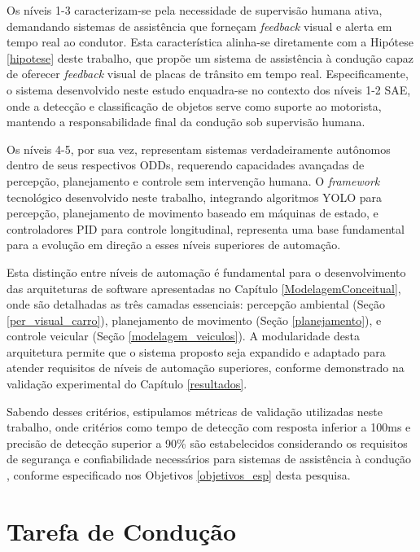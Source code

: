 Os níveis 1-3 caracterizam-se pela necessidade de supervisão humana ativa, demandando sistemas de assistência que forneçam \textit{feedback} visual e alerta em tempo real ao condutor. Esta característica alinha-se diretamente com a Hipótese \ref{hipotese} deste trabalho, que propõe um sistema de assistência à condução capaz de oferecer \textit{feedback} visual de placas de trânsito em tempo real. Especificamente, o sistema desenvolvido neste estudo enquadra-se no contexto dos níveis 1-2 SAE, onde a detecção e classificação de objetos serve como suporte ao motorista, mantendo a responsabilidade final da condução sob supervisão humana.

Os níveis 4-5, por sua vez, representam sistemas verdadeiramente autônomos dentro de seus respectivos ODDs, requerendo capacidades avançadas de percepção, planejamento e controle sem intervenção humana. O \textit{framework} tecnológico desenvolvido neste trabalho, integrando algoritmos YOLO para percepção, planejamento de movimento baseado em máquinas de estado, e controladores PID para controle longitudinal, representa uma base fundamental para a evolução em direção a esses níveis superiores de automação.

Esta distinção entre níveis de automação é fundamental para o desenvolvimento das arquiteturas de software apresentadas no Capítulo \ref{ModelagemConceitual}, onde são detalhadas as três camadas essenciais: percepção ambiental (Seção \ref{per_visual_carro}), planejamento de movimento (Seção \ref{planejamento}), e controle veicular (Seção \ref{modelagem_veiculos}). A modularidade desta arquitetura permite que o sistema proposto seja expandido e adaptado para atender requisitos de níveis de automação superiores, conforme demonstrado na validação experimental do Capítulo \ref{resultados}.

Sabendo desses critérios, estipulamos métricas de validação utilizadas neste trabalho, onde critérios como tempo de detecção com resposta inferior a 100ms e precisão de detecção superior a 90\% são estabelecidos considerando os requisitos de segurança e confiabilidade necessários para sistemas de assistência à condução \cite[p. ~105]{castro2009human}, conforme especificado nos Objetivos \ref{objetivos_esp} desta pesquisa.

\section{Tarefa de Condução}\label{componentes_da_tarefa_de_conducao}

